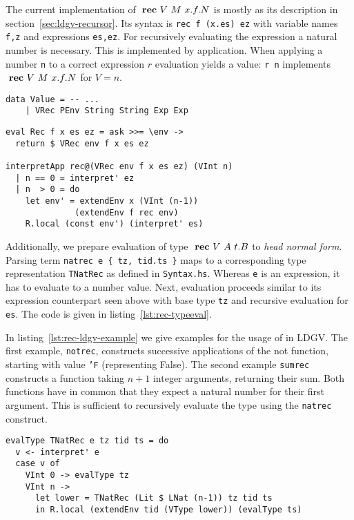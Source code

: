 The current implementation of $\text{ \textbf{rec} } V~M~x.f.N$ is mostly as its description in section~\ref{sec:ldgv-recursor}. Its syntax is \texttt{rec f (x.es) ez} with variable names \texttt{f,z} and expressions \texttt{es,ez}. For recursively evaluating the expression a natural number is necessary. This is implemented by application. When applying a number \texttt{n} to a correct \rec expression $r$ evaluation yields a value: \texttt{r n} implements $\text{ \textbf{rec} } V~M~x.f.N$ for $V=n$.

\begin{lstlisting}[float,
	label=lst:rec-typeext,
	caption=(\texttt{ProcessEnvironment.hs})]
data Value = -- ...
    | VRec PEnv String String Exp Exp
\end{lstlisting}

\begin{lstlisting}[float,
	label=lst:rec-eval,
	caption=(\texttt{Interpreter.hs})]
eval Rec f x es ez = ask >>= \env ->
  return $ VRec env f x es ez
  
interpretApp rec@(VRec env f x es ez) (VInt n)
  | n == 0 = interpret' ez
  | n  > 0 = do
    let env' = extendEnv x (VInt (n-1))
              (extendEnv f rec env)
    R.local (const env') (interpret' es)
\end{lstlisting}

Additionally, we prepare evaluation of type $\text{ \textbf{rec} } V~A~t.B$ to \emph{head normal form}. Parsing term \texttt{natrec e \{ tz, tid.ts \}} maps to a corresponding type representation \texttt{TNatRec} as defined in \texttt{Syntax.hs}. Whereas \texttt{e} is an expression, it has to evaluate to a number value. Next, evaluation proceeds similar to its expression counterpart seen above with base type \texttt{tz} and recursive evaluation for \texttt{es}. The code is given in listing~\ref{lst:rec-typeeval}.

In listing~\ref{lst:rec-ldgv-example} we give examples for the usage of \rec in  LDGV. The first example, \texttt{notrec}, constructs successive applications of the not function, starting with value \texttt{'F} (representing False). The second example \texttt{sumrec} constructs a function taking $n+1$ integer arguments, returning their sum. Both functions have in common that they expect a natural number for their first argument. This is sufficient to recursively evaluate the type using the \texttt{natrec} construct.

\begin{lstlisting}[float,
	label=lst:rec-typeeval,
	caption=Evaluation of \rec type to HNF(\texttt{Interpreter.hs})]
evalType TNatRec e tz tid ts = do
  v <- interpret' e
  case v of
    VInt 0 -> evalType tz
    VInt n ->
      let lower = TNatRec (Lit $ LNat (n-1)) tz tid ts
      in R.local (extendEnv tid (VType lower)) (evalType ts)
\end{lstlisting}

